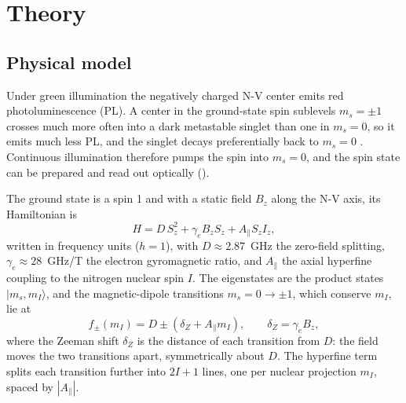 \section{Theory}
\label{sec:theory}

\subsection{Physical model}
\label{sec:model}


Under green illumination the negatively charged N-V center emits red photoluminescence (PL). A center in the
ground-state spin sublevels $m_s=\pm1$ crosses much more often into a dark metastable singlet than one in $m_s=0$, so it
emits much less PL, and the singlet decays preferentially back to $m_s=0$ \cite{manson2006,doherty2013nv}. Continuous
illumination therefore pumps the spin into $m_s=0$, and the spin state can be prepared and read out optically
().

The ground state is a spin 1 and with a static field $B_z$ along the N-V axis, its Hamiltonian is \cite{doherty2013nv}
\begin{equation}
  H=D\,S_z^2+\gamma_e B_z S_z+A_\parallel S_zI_z ,
  \label{eq:hamiltonian}
\end{equation}
written in frequency units ($h=1$), with $D\approx2.87$~GHz the zero-field splitting, $\gamma_e\approx28$~GHz/T the electron gyromagnetic ratio, and
$A_\parallel$ the axial hyperfine coupling to the nitrogen nuclear spin $I$. The eigenstates are the product states
$|m_s,m_I\rangle$, and the magnetic-dipole transitions $m_s=0\to\pm1$, which conserve $m_I$, lie at
\begin{equation}
  f_\pm(m_I)=D\pm\left(\delta_Z+A_\parallel m_I\right),\qquad \delta_Z=\gamma_e B_z ,
  \label{eq:transitions}
\end{equation}
where the Zeeman shift $\delta_Z$ is the distance of each transition from $D$: the field moves the two transitions
apart, symmetrically about $D$. The hyperfine term splits each transition further into $2I+1$ lines, one per
nuclear projection $m_I$, spaced by $|A_\parallel|$.


